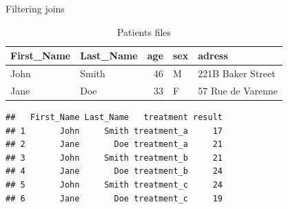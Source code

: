 \documentclass[14pt,ignorenonframetext,]{bredelebeamer}
\newenvironment{Shaded}{\begin{snugshade}}{\end{snugshade}}
\newcommand{\KeywordTok}[1]{\textcolor[rgb]{0.94,0.87,0.69}{#1}}
\newcommand{\DataTypeTok}[1]{\textcolor[rgb]{0.87,0.87,0.75}{#1}}
\newcommand{\DecValTok}[1]{\textcolor[rgb]{0.86,0.86,0.80}{#1}}
\newcommand{\StringTok}[1]{\textcolor[rgb]{0.80,0.58,0.58}{#1}}
\newcommand{\OperatorTok}[1]{\textcolor[rgb]{0.94,0.94,0.82}{#1}}
\newcommand{\NormalTok}[1]{\textcolor[rgb]{0.80,0.80,0.80}{#1}}
\begin{document}
\begin{frame}[fragile]{Filtering joins}

\begin{table}[t]

\caption{\label{tab:unnamed-chunk-56}Patients files}
\centering
\begin{tabular}{l|l|r|l|l}
\hline
First\_Name & Last\_Name & age & sex & adress\\
\hline
John & Smith & 46 & M & 221B Baker Street\\
\hline
Jane & Doe & 33 & F & 57 Rue de Varenne\\
\hline
\end{tabular}
\end{table}

\begin{Shaded}
\end{Shaded}

\begin{verbatim}
##   First_Name Last_Name   treatment result
## 1       John     Smith treatment_a     17
## 2       Jane       Doe treatment_a     21
## 3       John     Smith treatment_b     21
## 4       Jane       Doe treatment_b     24
## 5       John     Smith treatment_c     24
## 6       Jane       Doe treatment_c     19
\end{verbatim}

\end{frame}
\end{document}
